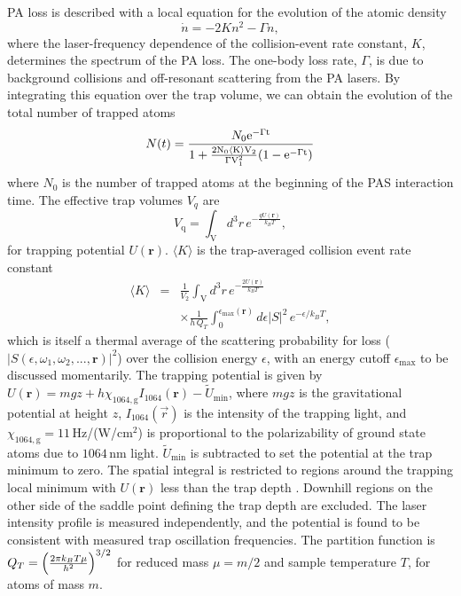 PA loss is described with a local equation for the evolution of the atomic density
\begin{equation}\label{densitydecay}
	\dot{n}=-2 Kn^2-\Gamma n,
\end{equation}
where the laser-frequency dependence of the collision-event rate constant, $K$, determines the spectrum of the PA loss. The one-body loss rate, $\Gamma$, is due to background collisions and off-resonant scattering from the PA lasers. By integrating this equation over the trap volume, we can obtain the evolution of the total number of trapped atoms
\begin{equation}\label{number}
   N(t)={N_0 \rm{e}^{-\Gamma t} \over 1+
   {2 N_0 \langle K \rangle V_2\over \Gamma V_1^2}(1-\rm{e}^{-\Gamma t})}
\end{equation}
where $N_0$ is the number of trapped atoms at the beginning of the PAS interaction time. The effective trap volumes $V_q$ are 
\begin{equation}
	V_{\text{q}}=\int_{\mathrm{V}} d^3r \, e^{-\frac{qU(\mathbf{r})}{k_{B}T}},
\end{equation}
for trapping potential $U(\mathbf{r})$. 
 $\langle K \rangle$ is the trap-averaged collision event rate constant
\begin{eqnarray}
  \langle K \rangle&=& \frac{1}{V_{2}}\int_{\mathrm{V}} d^3r \,e^{-\frac{2U(\mathbf{r})}{k_{B}T}} \nonumber \\
  &&\times \frac{1}{h\,Q_{T}} \int_{0}^{\epsilon_{\text{max}}({\mathbf{r}})}d\epsilon \vert S\vert^2 \,e^{-\epsilon/k_{B}T},
\end{eqnarray}
which is itself a thermal average of the scattering probability for loss ($\vert S(\epsilon,\omega_1,\omega_2,...,\mathbf{r})\vert^2$) over the collision energy $\epsilon$, with an energy cutoff $\epsilon_{\text{max}}$ to be discussed momentarily. The trapping potential is given by $U(\mathbf{r})=mgz +h\chi_{1064,\text{g}}I_{1064}(\mathbf{r})-\tilde{U}_{\text{min}}$, where $mgz$ is the gravitational potential at height $z$, $I_{1064}(\vec{r})$ is the intensity of the trapping light, and $\chi_{1064,\text{g}}=11$\,Hz/(W/cm$^2$) \cite{YeKatori2008} is proportional to the polarizability of ground state atoms due to $1064$\,nm light. $\tilde{U}_{\text{min}}$ is subtracted to set the potential at the trap minimum to zero. The spatial integral is restricted to regions around the trapping local minimum with $U(\mathbf{r})$ less than the trap depth \cite{ycm11}. Downhill regions on the other side of the saddle point defining the trap depth are excluded. The laser intensity profile is measured independently, and the potential is found to be consistent with measured trap oscillation frequencies. The partition function is $Q_{T}=\left({2\pi k_{B}T \mu \over h^2}\right) ^{3/2}$ for reduced mass $\mu=m/2$ and sample temperature $T$, for atoms of mass $m$.

